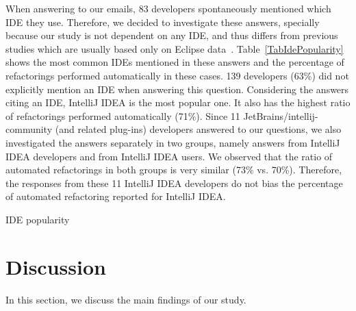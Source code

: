 When answering to our emails, 83 developers spon\-ta\-ne\-ously mentioned which IDE they use. 
Therefore, we decided to investigate these answers, specially because our study is not dependent
on any IDE, and thus differs from previous studies which are usually based only on 
Eclipse data~\citep{MurphyHill2012,negara2013}.
Table~\ref{TabIdePopularity} shows the most common IDEs mentioned in these answers and the percentage 
of refactorings performed automatically in these cases.
139 developers (63\%) did not explicitly mention an IDE when answering this question. 
Considering the answers citing an IDE, IntelliJ IDEA is the most popular one. 
It also has the highest ratio of refactorings performed automatically (71\%). 
Since 11 {\textsc JetBrains/\-intellij-community} (and related plug-ins) developers answered to our questions, 
we also investigated the answers separately in two groups, namely 
answers from IntelliJ IDEA developers and from IntelliJ IDEA users.
We observed that the ratio of automated refactorings in both groups is very similar (73\% vs. 70\%).
Therefore, the responses from these 11 IntelliJ IDEA developers do not bias the percentage of automated refactoring reported for 
IntelliJ IDEA. 



\begin{table}[htbp]
\centering
\renewcommand{\arraystretch}{1.2}
\caption{IDE popularity}
\label{TabIdePopularity}

\end{table}





\section{Discussion}

In this section, we discuss the main findings of our study.\margin



